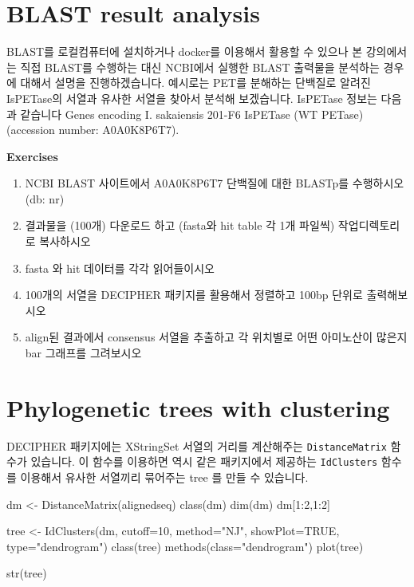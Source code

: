 \documentclass[
]{book}
\newenvironment{Shaded}{\begin{snugshade}}{\end{snugshade}}
\newcommand{\AttributeTok}[1]{\textcolor[rgb]{0.77,0.63,0.00}{#1}}
\newcommand{\ConstantTok}[1]{\textcolor[rgb]{0.00,0.00,0.00}{#1}}
\newcommand{\DecValTok}[1]{\textcolor[rgb]{0.00,0.00,0.81}{#1}}
\newcommand{\FunctionTok}[1]{\textcolor[rgb]{0.00,0.00,0.00}{#1}}
\newcommand{\NormalTok}[1]{#1}
\newcommand{\OtherTok}[1]{\textcolor[rgb]{0.56,0.35,0.01}{#1}}
\newcommand{\SpecialCharTok}[1]{\textcolor[rgb]{0.00,0.00,0.00}{#1}}
\newcommand{\StringTok}[1]{\textcolor[rgb]{0.31,0.60,0.02}{#1}}
\begin{document}
\hypertarget{blast-result-analysis}{%
\section{BLAST result analysis}\label{blast-result-analysis}}

BLAST를 로컬컴퓨터에 설치하거나 docker를 이용해서 활용할 수 있으나 본 강의에서는 직접 BLAST를 수행하는 대신 NCBI에서 실행한 BLAST 출력물을 분석하는 경우에 대해서 설명을 진행하겠습니다. 예시로는 PET를 분해하는 단백질로 알려진 IsPETase의 서열과 유사한 서열을 찾아서 분석해 보겠습니다. IsPETase 정보는 다음과 같습니다 Genes encoding I. sakaiensis 201-F6 IsPETase (WT PETase) (accession number: A0A0K8P6T7).

\textbf{Exercises }

\begin{enumerate}
\def\labelenumi{\arabic{enumi})}
\item
  NCBI BLAST 사이트에서 A0A0K8P6T7 단백질에 대한 BLASTp를 수행하시오 (db: nr)
\item
  결과물을 (100개) 다운로드 하고 (fasta와 hit table 각 1개 파일씩) 작업디렉토리로 복사하시오
\item
  fasta 와 hit 데이터를 각각 읽어들이시오
\item
  100개의 서열을 DECIPHER 패키지를 활용해서 정렬하고 100bp 단위로 출력해보시오
\item
  align된 결과에서 consensus 서열을 추출하고 각 위치별로 어떤 아미노산이 많은지 bar 그래프를 그려보시오
\end{enumerate}

\hypertarget{phylogenetic-trees-with-clustering}{%
\section{Phylogenetic trees with clustering}\label{phylogenetic-trees-with-clustering}}

DECIPHER 패키지에는 XStringSet 서열의 거리를 계산해주는 \texttt{DistanceMatrix} 함수가 있습니다. 이 함수를 이용하면 역시 같은 패키지에서 제공하는 \texttt{IdClusters} 함수를 이용해서 유사한 서열끼리 묶어주는 tree 를 만들 수 있습니다.

\begin{Shaded}
\begin{Highlighting}[]
\NormalTok{dm }\OtherTok{\textless{}{-}} \FunctionTok{DistanceMatrix}\NormalTok{(alignedseq)}
\FunctionTok{class}\NormalTok{(dm)}
\FunctionTok{dim}\NormalTok{(dm)}
\NormalTok{dm[}\DecValTok{1}\SpecialCharTok{:}\DecValTok{2}\NormalTok{,}\DecValTok{1}\SpecialCharTok{:}\DecValTok{2}\NormalTok{]}

\NormalTok{tree }\OtherTok{\textless{}{-}} \FunctionTok{IdClusters}\NormalTok{(dm, }\AttributeTok{cutoff=}\DecValTok{10}\NormalTok{, }\AttributeTok{method=}\StringTok{"NJ"}\NormalTok{, }\AttributeTok{showPlot=}\ConstantTok{TRUE}\NormalTok{, }\AttributeTok{type=}\StringTok{"dendrogram"}\NormalTok{)}
\FunctionTok{class}\NormalTok{(tree)}
\FunctionTok{methods}\NormalTok{(}\AttributeTok{class=}\StringTok{"dendrogram"}\NormalTok{)}
\FunctionTok{plot}\NormalTok{(tree)}

\FunctionTok{str}\NormalTok{(tree)}
\end{Highlighting}
\end{Shaded}
\end{document}
